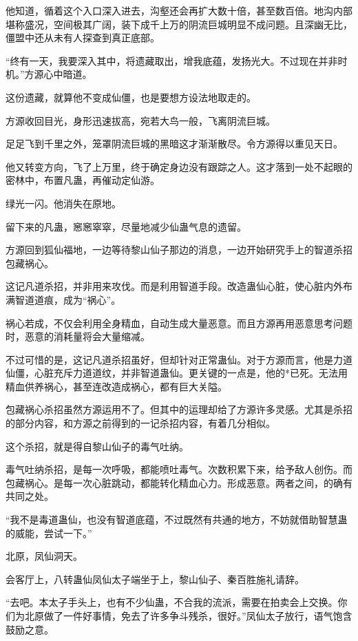 \begin{this_body}
他知道，循着这个入口深入进去，沟壑还会再扩大数十倍，甚至数百倍。地沟内部堪称盛况，空间极其广阔，装下成千上万的阴流巨城明显不成问题。且深幽无比，僵盟中还从未有人探查到真正底部。

“终有一天，我要深入其中，将遗藏取出，增我底蕴，发扬光大。不过现在并非时机。”方源心中暗道。

这份遗藏，就算他不变成仙僵，也是要想方设法地取走的。

方源收回目光，身形迅速拔高，宛若大鸟一般，飞离阴流巨城。

足足飞到千里之外，笼罩阴流巨城的黑暗这才渐渐散尽。令方源得以重见天日。

他又转变方向，飞了上万里，终于确定身边没有跟踪之人。这才落到一处不起眼的密林中，布置凡蛊，再催动定仙游。

绿光一闪。他消失在原地。

留下来的凡蛊，窸窸窣窣，尽量地减少仙蛊气息的遗留。

方源回到狐仙福地，一边等待黎山仙子那边的消息，一边开始研究手上的智道杀招包藏祸心。

这记凡道杀招，并非用来攻伐。而是利用智道手段。改造蛊仙心脏，使心脏内外布满智道道痕，成为“祸心”。

祸心若成，不仅会利用全身精血，自动生成大量恶意。而且方源再用恶意思考问题时，恶意的消耗量将会大量缩减。

不过可惜的是，这记凡道杀招虽好，但却针对正常蛊仙。对于方源而言，他是力道仙僵，心脏充斥力道道纹，并非智道蛊仙。更关键的一点是，他的*已死。无法用精血供养祸心，甚至连改造成祸心，都有巨大关隘。

包藏祸心杀招虽然方源运用不了。但其中的运理却给了方源许多灵感。尤其是杀招的部分内容，和方源之前得到的一记杀招内容，有着几分相似。

这个杀招，就是得自黎山仙子的毒气吐纳。

毒气吐纳杀招，是每一次呼吸，都能喷吐毒气。次数积累下来，给予敌人创伤。而包藏祸心。是每一次心脏跳动，都能转化精血心力。形成恶意。两者之间，的确有共同之处。

“我不是毒道蛊仙，也没有智道底蕴，不过既然有共通的地方，不妨就借助智慧蛊的威能，尝试一下。”

北原，凤仙洞天。

会客厅上，八转蛊仙凤仙太子端坐于上，黎山仙子、秦百胜施礼请辞。

“去吧。本太子手头上，也有不少仙蛊，不合我的流派，需要在拍卖会上交换。你们为北原做了一件好事情，免去了许多争斗残杀，很好。”凤仙太子放行，语气饱含鼓励之意。


\end{this_body}
